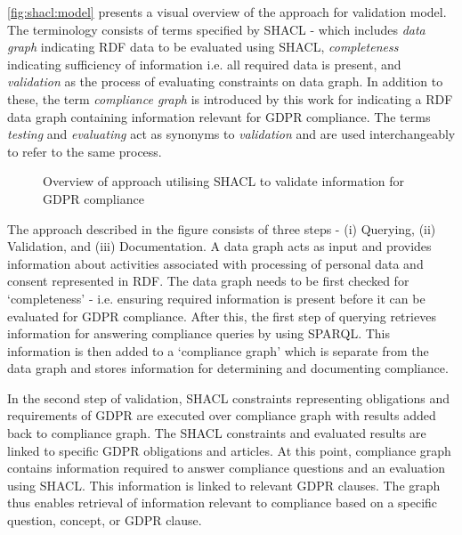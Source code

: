 \autoref{fig:shacl:model} presents a visual overview of the approach for validation model.
The terminology consists of terms specified by SHACL - which includes 
	\textit{data graph} indicating RDF data to be evaluated using SHACL,
 	\textit{completeness} indicating sufficiency of information i.e. all required data is present, 
 	and \textit{validation} as the process of evaluating constraints on data graph.
In addition to these, the term \textit{compliance graph} is introduced by this work for indicating a RDF data graph containing information relevant for GDPR compliance.
The terms \textit{testing} and \textit{evaluating} act as synonyms to \textit{validation} and are used interchangeably to refer to the same process.
\begin{figure}[htbp]
    \centering
    \caption{Overview of approach utilising SHACL to validate information for GDPR compliance}
    \label{fig:shacl:model}
\end{figure}

The approach described in the figure consists of three steps - (i) Querying, (ii) Validation, and (iii) Documentation. A data graph acts as input and provides information about activities associated with processing of personal data and consent represented in RDF. The data graph needs to be first checked for `completeness' - i.e. ensuring required information is present before it can be evaluated for GDPR compliance.
After this, the first step of querying retrieves information for answering compliance queries by using SPARQL. This information is then added to a `compliance graph' which is separate from the data graph and stores information for determining and documenting compliance.

In the second step of validation, SHACL constraints representing obligations and requirements of GDPR are executed over compliance graph with results added back to compliance graph.
The SHACL constraints and evaluated results are linked to specific GDPR obligations and articles.
At this point, compliance graph contains information required to answer compliance questions and an evaluation using SHACL. This information is linked to relevant GDPR clauses. The graph thus enables retrieval of information relevant to compliance based on a specific question, concept, or GDPR clause.

